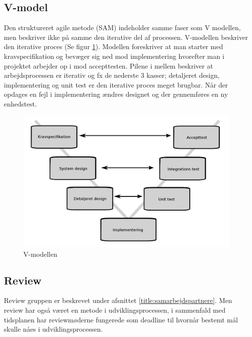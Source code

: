 \subsection{V-model}
Den struktureret agile metode (SAM) indeholder samme faser som V modellen, men beskriver ikke på samme den iterative del af processen. V-modellen beskriver den iterative proces (Se figur \ref{fig:vmodel}). Modellen foreskriver at man starter med kravspecifikation og bevæger sig ned mod implementering hvorefter man i projektet arbejder op i mod accepttesten. Pilene i mellem beskriver at arbejdsprocessen er iterativ og fx de nederste 3 kasser; detaljeret design, implementering og unit test er den iterative proces meget brugbar. Når der opdages en fejl i implementering ændres designet og der gennemføres en ny enhedstest.  
\begin{figure}[H]
	\includegraphics[width = \textwidth]{billeder/Vmodel.png}
	\caption{V-modellen}\label{fig:vmodel}
\end{figure}

\subsection{Review}
Review gruppen er beskrevet under afsnittet \ref{title:samarbejdspartnere}. Men review har også været en metode i udviklingsprocessen, i sammenfald med tidsplanen har reviewmøderne fungerede som deadline til hvornår bestemt mål skulle nåes i udviklingsprocessen. 

